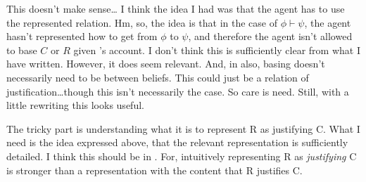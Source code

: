 {
  \color{red}
  This doesn't make sense\dots
  I think the idea I had was that the agent has to use the represented relation.
  Hm, so, the idea is that in the case of \(\phi \vdash \psi\), the agent hasn't represented how to get from \(\phi\) to \(\psi\), and therefore the agent isn't allowed to base \(C\) or \(R\) given \citeauthor{Neta:2019aa}'s account.
  I don't think this is sufficiently clear from what I have written.
  However, it does seem relevant.
  And, in also, basing doesn't necessarily need to be between beliefs.
  This could just be a relation of justification\dots though this isn't necessarily the case.
  So care is need.
  Still, with a little rewriting this looks useful.

  The tricky part is understanding what it is to represent R as justifying C.
  What I need is the idea expressed above, that the relevant representation is sufficiently detailed.
  I think this should be in \citeauthor{Neta:2019aa}.
  For, intuitively representing R as \emph{justifying} C is stronger than a representation with the content that R justifies C.
}

